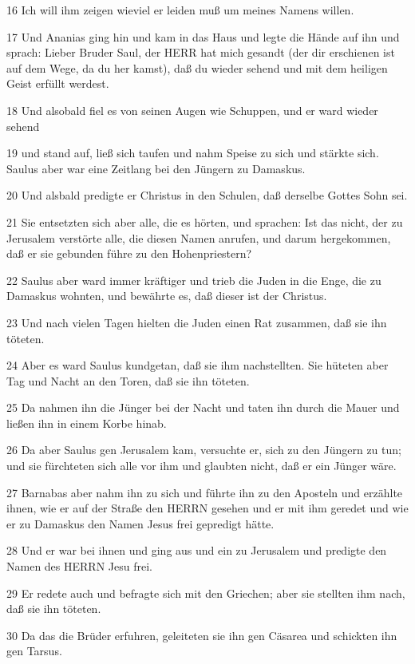 \par 16 Ich will ihm zeigen wieviel er leiden muß um meines Namens willen.
\par 17 Und Ananias ging hin und kam in das Haus und legte die Hände auf ihn und sprach: Lieber Bruder Saul, der HERR hat mich gesandt (der dir erschienen ist auf dem Wege, da du her kamst), daß du wieder sehend und mit dem heiligen Geist erfüllt werdest.
\par 18 Und alsobald fiel es von seinen Augen wie Schuppen, und er ward wieder sehend
\par 19 und stand auf, ließ sich taufen und nahm Speise zu sich und stärkte sich. Saulus aber war eine Zeitlang bei den Jüngern zu Damaskus.
\par 20 Und alsbald predigte er Christus in den Schulen, daß derselbe Gottes Sohn sei.
\par 21 Sie entsetzten sich aber alle, die es hörten, und sprachen: Ist das nicht, der zu Jerusalem verstörte alle, die diesen Namen anrufen, und darum hergekommen, daß er sie gebunden führe zu den Hohenpriestern?
\par 22 Saulus aber ward immer kräftiger und trieb die Juden in die Enge, die zu Damaskus wohnten, und bewährte es, daß dieser ist der Christus.
\par 23 Und nach vielen Tagen hielten die Juden einen Rat zusammen, daß sie ihn töteten.
\par 24 Aber es ward Saulus kundgetan, daß sie ihm nachstellten. Sie hüteten aber Tag und Nacht an den Toren, daß sie ihn töteten.
\par 25 Da nahmen ihn die Jünger bei der Nacht und taten ihn durch die Mauer und ließen ihn in einem Korbe hinab.
\par 26 Da aber Saulus gen Jerusalem kam, versuchte er, sich zu den Jüngern zu tun; und sie fürchteten sich alle vor ihm und glaubten nicht, daß er ein Jünger wäre.
\par 27 Barnabas aber nahm ihn zu sich und führte ihn zu den Aposteln und erzählte ihnen, wie er auf der Straße den HERRN gesehen und er mit ihm geredet und wie er zu Damaskus den Namen Jesus frei gepredigt hätte.
\par 28 Und er war bei ihnen und ging aus und ein zu Jerusalem und predigte den Namen des HERRN Jesu frei.
\par 29 Er redete auch und befragte sich mit den Griechen; aber sie stellten ihm nach, daß sie ihn töteten.
\par 30 Da das die Brüder erfuhren, geleiteten sie ihn gen Cäsarea und schickten ihn gen Tarsus.
